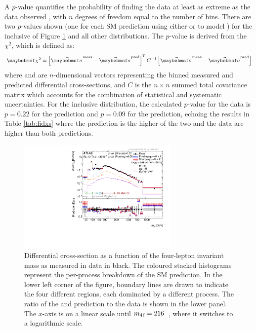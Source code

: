 A $p$-value quantifies the probability of finding the data at least as extreme as the data observed \cite{cowan_munich}, with $n$ degrees of freedom equal to the number of bins. There are two $p$-values shown (one for each SM prediction using either \SHERPA{} or \POWHEG{} to model \qqFourL{}) for the inclusive \mFourL{} of Figure \ref{fig:cross-sec-m4l} and all other distributions. The $p$-value is derived from the $\chi^2$, which is defined as:
\begin{equation}
    \chi^2 = \left[ \sigdata - \sigpred \right] ^T C^{-1} \left[  \sigdata - \sigpred  \right]
\end{equation}
where \sigdata{} and \sigpred are $n$-dimensional vectors representing the binned measured and predicted differential cross-sections, and $C$ is the $n\times n$ summed total covariance matrix which accounts for the combination of statistical and systematic uncertainties. For the inclusive \mFourL{} distribution, the calculated $p$-value for the data is $p=0.22$ for the \SHERPA{} prediction and $p=0.09$ for the \POWHEG{} prediction, echoing the results in Table \ref{tab:fidxs} where the \SHERPA{} prediction is the higher of the two and the data are higher than both predictions. 
\begin{figure}[h]
  \centering
  \includegraphics[width = 0.7\textwidth]{Figures/m4l/UnfoldedResults/linlog_Unfolded_Data_inclm4l.pdf} 
    \caption{Differential cross-section as a function of the four-lepton invariant mass \mFourL as measured in data in black. \errorbars{} \SMpredictions{} 
    The coloured stacked histograms represent the per-process breakdown of the SM prediction. In the lower left corner of the figure, boundary lines are drawn to indicate the four different \mFourL{} regions, each dominated by a different process. \Pvalue{} 
    The ratio of the \SHERPA{} and \POWHEG{} prediction to the data is shown in the lower panel. The $x$-axis is on a linear scale until $m_{4\ell} = 216$~\GeV, where it switches to a logarithmic scale. \label{fig:cross-sec-m4l}}
\end{figure}

